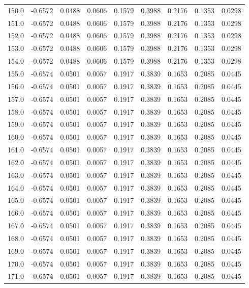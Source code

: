 \begin{longtable}{lrrrrrrrr}
150.0 & -0.6572 & 0.0488 & 0.0606 & 0.1579 & 0.3988 & 0.2176 & 0.1353 & 0.0298 \\
151.0 & -0.6572 & 0.0488 & 0.0606 & 0.1579 & 0.3988 & 0.2176 & 0.1353 & 0.0298 \\
152.0 & -0.6572 & 0.0488 & 0.0606 & 0.1579 & 0.3988 & 0.2176 & 0.1353 & 0.0298 \\
153.0 & -0.6572 & 0.0488 & 0.0606 & 0.1579 & 0.3988 & 0.2176 & 0.1353 & 0.0298 \\
154.0 & -0.6572 & 0.0488 & 0.0606 & 0.1579 & 0.3988 & 0.2176 & 0.1353 & 0.0298 \\
155.0 & -0.6574 & 0.0501 & 0.0057 & 0.1917 & 0.3839 & 0.1653 & 0.2085 & 0.0445 \\
156.0 & -0.6574 & 0.0501 & 0.0057 & 0.1917 & 0.3839 & 0.1653 & 0.2085 & 0.0445 \\
157.0 & -0.6574 & 0.0501 & 0.0057 & 0.1917 & 0.3839 & 0.1653 & 0.2085 & 0.0445 \\
158.0 & -0.6574 & 0.0501 & 0.0057 & 0.1917 & 0.3839 & 0.1653 & 0.2085 & 0.0445 \\
159.0 & -0.6574 & 0.0501 & 0.0057 & 0.1917 & 0.3839 & 0.1653 & 0.2085 & 0.0445 \\
160.0 & -0.6574 & 0.0501 & 0.0057 & 0.1917 & 0.3839 & 0.1653 & 0.2085 & 0.0445 \\
161.0 & -0.6574 & 0.0501 & 0.0057 & 0.1917 & 0.3839 & 0.1653 & 0.2085 & 0.0445 \\
162.0 & -0.6574 & 0.0501 & 0.0057 & 0.1917 & 0.3839 & 0.1653 & 0.2085 & 0.0445 \\
163.0 & -0.6574 & 0.0501 & 0.0057 & 0.1917 & 0.3839 & 0.1653 & 0.2085 & 0.0445 \\
164.0 & -0.6574 & 0.0501 & 0.0057 & 0.1917 & 0.3839 & 0.1653 & 0.2085 & 0.0445 \\
165.0 & -0.6574 & 0.0501 & 0.0057 & 0.1917 & 0.3839 & 0.1653 & 0.2085 & 0.0445 \\
166.0 & -0.6574 & 0.0501 & 0.0057 & 0.1917 & 0.3839 & 0.1653 & 0.2085 & 0.0445 \\
167.0 & -0.6574 & 0.0501 & 0.0057 & 0.1917 & 0.3839 & 0.1653 & 0.2085 & 0.0445 \\
168.0 & -0.6574 & 0.0501 & 0.0057 & 0.1917 & 0.3839 & 0.1653 & 0.2085 & 0.0445 \\
169.0 & -0.6574 & 0.0501 & 0.0057 & 0.1917 & 0.3839 & 0.1653 & 0.2085 & 0.0445 \\
170.0 & -0.6574 & 0.0501 & 0.0057 & 0.1917 & 0.3839 & 0.1653 & 0.2085 & 0.0445 \\
171.0 & -0.6574 & 0.0501 & 0.0057 & 0.1917 & 0.3839 & 0.1653 & 0.2085 & 0.0445 \\

\end{longtable}
